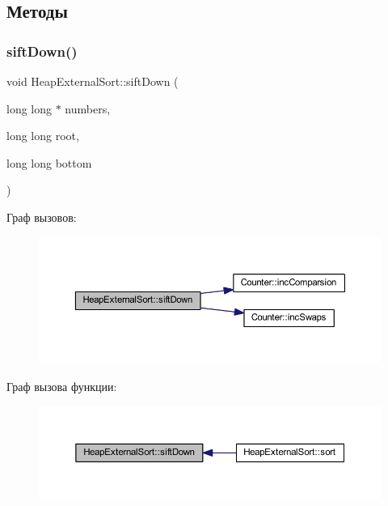 \subsection{Методы}
\hypertarget{class_heap_external_sort_a927eea9dcf44a9c7d53db1039bc7e21f}{}\label{class_heap_external_sort_a927eea9dcf44a9c7d53db1039bc7e21f} 
\subsubsection{\texorpdfstring{sift\+Down()}{siftDown()}}
{\footnotesize\ttfamily void Heap\+External\+Sort\+::sift\+Down (\begin{DoxyParamCaption}\item[{long long $\ast$}]{numbers,  }\item[{long long}]{root,  }\item[{long long}]{bottom }\end{DoxyParamCaption})\hspace{0.3cm}{\ttfamily [private]}}

Граф вызовов\+:\nopagebreak
\begin{figure}[H]
\begin{center}
\leavevmode
\includegraphics[width=350pt]{class_heap_external_sort_a927eea9dcf44a9c7d53db1039bc7e21f_cgraph}
\end{center}
\end{figure}
Граф вызова функции\+:\nopagebreak
\begin{figure}[H]
\begin{center}
\leavevmode
\includegraphics[width=350pt]{class_heap_external_sort_a927eea9dcf44a9c7d53db1039bc7e21f_icgraph}
\end{center}
\end{figure}
\hypertarget{class_heap_external_sort_a908087ce13932b268a35e1184a05ea44}{}\label{class_heap_external_sort_a908087ce13932b268a35e1184a05ea44} 
